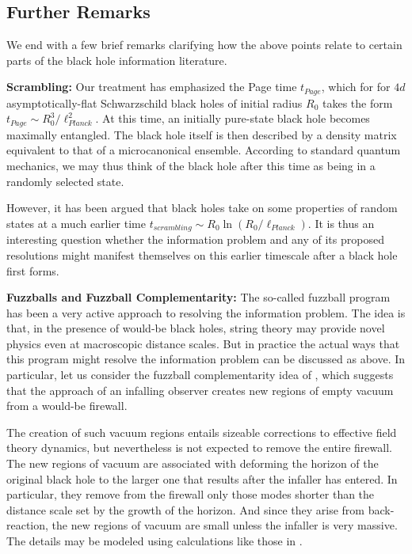\documentclass[12pt]{article}
\begin{document}
\subsection{Further Remarks}
\label{remarks}

We end with a few brief remarks clarifying how the above points relate to certain parts of the black hole information literature.

{\bf Scrambling:}  Our treatment has emphasized the Page time $t_{Page}$, which for
for $4d$ asymptotically-flat Schwarzschild black holes of initial radius $R_0$ takes the form $t_{Page} \sim R_0^3/\ell_{Planck}^2$.  At this time, an initially pure-state black hole becomes maximally entangled.  The black hole itself is then described by a density matrix equivalent to that of a microcanonical ensemble. According to standard quantum mechanics, we may thus think of the black hole after this time as being in a randomly selected state.

However, it has been argued \cite{Hayden:2007cs,Sekino:2008he} that black holes take on some properties of random states at a much earlier time $t_{scrambling} \sim R_0 \ln \left(R_0/\ell_{Planck}\right)$.  It is thus an interesting question \cite{Almheiri:2012rt} whether the information problem and any of its proposed resolutions might manifest themselves on this earlier timescale after a black hole first forms.


{\bf Fuzzballs and Fuzzball Complementarity:}   The so-called fuzzball program \cite{Mathur:2005zp,Bena:2007kg,Balasubramanian:2008da,Skenderis:2008qn,Mathur:2008nj,Chowdhury:2010ct,Bena:2013dka} has been a very active approach to resolving the information problem.  The idea is that, in the presence of would-be black holes, string theory may provide novel physics even at macroscopic distance scales.  But in practice the actual ways that this program might resolve the information problem can be discussed as above.  In particular, let us consider the fuzzball complementarity idea of \cite{Mathur:2012jk,Mathur:2013gua}, which suggests that the approach of an infalling observer creates new regions of empty vacuum from a would-be firewall.

The creation of such vacuum regions entails sizeable corrections to effective field theory dynamics, but nevertheless is not expected to remove the entire firewall.  The new regions of vacuum are associated with deforming the horizon of the original black hole to the larger one that results after the infaller has entered.  In particular, they remove  from the firewall only those modes shorter than the distance scale set by the growth of the horizon. And since they arise from back-reaction, the new regions of vacuum are small unless the infaller is very massive.  The details may be modeled using calculations like those in \cite{Amsel:2007cw}.
\end{document}
